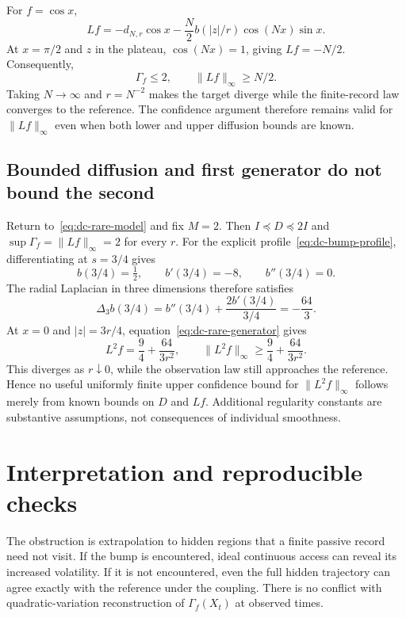 For $f=\cos x$,
\[
 Lf=-d_{N,r}\cos x-\frac N2 b(|z|/r)\cos(Nx)\sin x.
\]
At $x=\pi/2$ and $z$ in the plateau, $\cos(Nx)=1$, giving $Lf=-N/2$.
Consequently,
\begin{equation}
 \Gamma_f\leq2,\qquad \|Lf\|_\infty\geq N/2.
 \label{eq:dc-bounded-first-target}
\end{equation}
Taking $N\to\infty$ and $r=N^{-2}$ makes the target diverge while the
finite-record law converges to the reference. The confidence argument
therefore remains valid for $\|Lf\|_\infty$ even when both lower and
upper diffusion bounds are known.

\subsection{Bounded diffusion and first generator do not bound the second}

Return to~\eqref{eq:dc-rare-model} and fix $M=2$. Then
$I\preceq D\preceq2I$ and
$\sup\Gamma_f=\|Lf\|_\infty=2$ for every $r$.
For the explicit profile~\eqref{eq:dc-bump-profile}, differentiating at
$s=3/4$ gives
\[
 b(3/4)=\tfrac12,\qquad b'(3/4)=-8,\qquad b''(3/4)=0.
\]
The radial Laplacian in three dimensions therefore satisfies
\[
 \Delta_3b(3/4)=b''(3/4)+\frac{2b'(3/4)}{3/4}=-\frac{64}{3}.
\]
At $x=0$ and $|z|=3r/4$, equation~\eqref{eq:dc-rare-generator} gives
\begin{equation}
 L^2f=\frac94+\frac{64}{3r^2},\qquad
 \|L^2f\|_\infty\geq\frac94+\frac{64}{3r^2}.
 \label{eq:dc-bounded-second-target}
\end{equation}
This diverges as $r\downarrow0$, while the observation law still approaches
the reference. Hence no useful uniformly finite upper confidence bound
for $\|L^2f\|_\infty$ follows merely from known bounds on $D$ and $Lf$.
Additional regularity constants are substantive assumptions, not
consequences of individual smoothness.

\section{Interpretation and reproducible checks}

The obstruction is extrapolation to hidden regions that a finite passive
record need not visit. If the bump is encountered, ideal continuous access
can reveal its increased volatility. If it is not encountered, even the
full hidden trajectory can agree exactly with the reference under the
coupling. There is no conflict with quadratic-variation reconstruction of
$\Gamma_f(X_t)$ at observed times.

